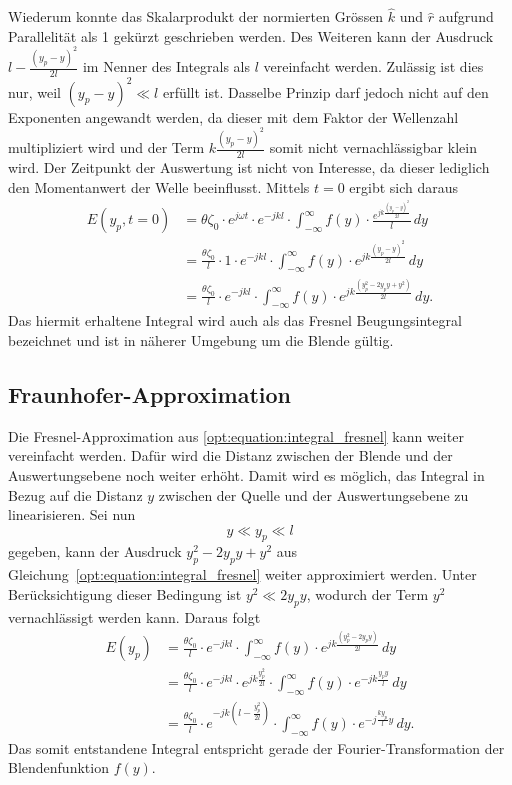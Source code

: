 Wiederum konnte das Skalarprodukt der normierten Grössen $\hat{k}$ und $\hat{r}$ aufgrund Parallelität als 1 gekürzt geschrieben werden.
Des Weiteren kann der Ausdruck $l - \frac{(y_p-y)^2}{2l}$ im Nenner des Integrals als $l$ vereinfacht werden.
Zulässig ist dies nur, weil $(y_p - y)^2 \ll l$ erfüllt ist.
Dasselbe Prinzip darf jedoch nicht auf den Exponenten angewandt werden, da dieser mit dem Faktor der Wellenzahl multipliziert wird und der Term $k \frac{(y_p-y)^2}{2l}$ somit nicht vernachlässigbar klein wird.
Der Zeitpunkt der Auswertung ist nicht von Interesse, da dieser lediglich den Momentanwert der Welle beeinflusst.
Mittels $t = 0$ ergibt sich daraus
\begin{align}
E(y_p, t = 0)
&=
\theta\zeta_0 \cdot e^{j\omega t} \cdot e^{-jkl} \cdot \int_{-\infty}^{\infty}f(y)\cdot\frac{e^{jk\frac{(y_p-y)^2}{2l}}}{l} \,dy
\\
&=
\frac{\theta\zeta_0}{l} \cdot 1 \cdot e^{-jkl} \cdot \int_{-\infty}^{\infty}f(y)\cdot e^{jk\frac{(y_p-y)^2}{2l}} \,dy
\\
&=
\frac{\theta\zeta_0}{l} \cdot e^{-jkl} \cdot \int_{-\infty}^{\infty}f(y)\cdot e^{jk\frac{(y_p^2 - 2y_py + y^2)}{2l}} \,dy
.
\label{opt:equation:integral_fresnel}
\end{align}
Das hiermit erhaltene Integral wird auch als das Fresnel Beugungsintegral bezeichnet und ist in näherer Umgebung um die Blende gültig.

\subsection{Fraunhofer-Approximation}
\label{opt:sec:fraunhofer}
Die Fresnel-Approximation aus \ref{opt:equation:integral_fresnel} kann weiter vereinfacht werden.
Dafür wird die Distanz zwischen der Blende und der Auswertungsebene noch weiter erhöht.
Damit wird es möglich, das Integral in Bezug auf die Distanz $y$ zwischen der Quelle und der Auswertungsebene zu linearisieren.
Sei nun
\begin{equation}
y
\ll
y_p
\ll
l
\end{equation}
gegeben, kann der Ausdruck $y_p^2 - 2y_py + y^2$ aus Gleichung~\ref{opt:equation:integral_fresnel} weiter approximiert werden.
Unter Berücksichtigung dieser Bedingung ist $y^2 \ll 2y_py$, wodurch der Term $y^2$ vernachlässigt werden kann.
Daraus folgt
\begin{align}
E(y_p)
&=
\frac{\theta\zeta_0}{l} \cdot e^{-jkl} \cdot \int_{-\infty}^{\infty}f(y)\cdot e^{jk\frac{(y_p^2 - 2y_py)}{2l}} \,dy
\\
&=
\frac{\theta\zeta_0}{l} \cdot e^{-jkl} \cdot e^{jk\frac{y_p^2}{2l}} \cdot \int_{-\infty}^{\infty}f(y)\cdot e^{-jk\frac{y_py}{l}} \,dy
\\
&=
\frac{\theta\zeta_0}{l} \cdot e^{-jk\left(l-\frac{y_p^2}{2l}\right)} \cdot \int_{-\infty}^{\infty}f(y)\cdot e^{-j\frac{ky_p}{l}y} \,dy
.
\label{opt:equation:integral_fraunhofer}
\end{align}
Das somit entstandene Integral entspricht gerade der Fourier-Transformation der Blendenfunktion $f(y)$.

